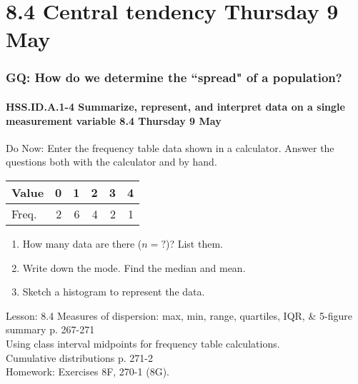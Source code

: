 \documentclass{beamer}
\begin{document}
\section{8.4 Central tendency Thursday 9 May}
  \frame
  {
    \frametitle{GQ: How do we determine the ``spread" of a population?}
    \framesubtitle{HSS.ID.A.1-4 Summarize, represent, and interpret data on a single measurement variable \hfill \alert{8.4 Thursday 9 May}}

    \begin{block}{Do Now: Enter the frequency table data shown in a calculator. Answer the questions both with the calculator and by hand.}
        \begin{tabular}{|l|r|r|r|r|r|}
          \hline
          Value & 0 & 1 & 2 & 3 & 4\\
          \hline
          Freq. & 2 & 6 & 4 & 2 & 1\\
          \hline
        \end{tabular}
        \begin{enumerate}
          \item How many data are there ($n=?$)? List them.
          \item Write down the mode. Find the median and mean.
          \item Sketch a histogram to represent the data.
      \end{enumerate}
    \end{block}

    Lesson: 8.4 Measures of dispersion: max, min, range, quartiles, IQR, \& 5-figure summary p. 267-271\\
    Using class interval midpoints for frequency table calculations.\\
    Cumulative distributions p. 271-2\\[0.25cm]
    Homework: Exercises 8F, 270-1 (8G).
  }
\end{document}
